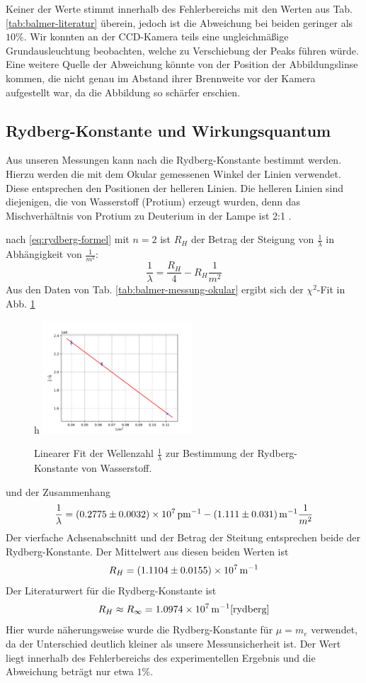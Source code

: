 \documentclass{article}
\begin{document}
Keiner der Werte stimmt innerhalb des Fehlerbereichs mit den Werten aus Tab. \ref{tab:balmer-literatur} überein,
jedoch ist die Abweichung bei beiden geringer als $10\%$. 
Wir konnten an der CCD-Kamera teils eine ungleichmäßige Grundausleuchtung beobachten, welche zu Verschiebung der Peaks führen würde.
Eine weitere Quelle der Abweichung könnte von der Position der Abbildungslinse kommen,
die nicht genau im Abstand ihrer Brennweite vor der Kamera aufgestellt war, da die Abbildung so schärfer erschien.


\subsection{Rydberg-Konstante und Wirkungsquantum}
Aus unseren Messungen kann nach die Rydberg-Konstante bestimmt werden.
Hierzu werden die mit dem Okular gemessenen Winkel der Linien verwendet. Diese entsprechen den
Positionen der helleren Linien. Die helleren Linien sind diejenigen, die von Wasserstoff (Protium) erzeugt wurden,
denn das Mischverhältnis von Protium zu Deuterium in der Lampe ist 2:1 \cite{Anleitung}.

nach \eqref{eq:rydberg-formel} mit $n=2$ ist $R_H$ der Betrag der Steigung von $\frac{1}{\lambda}$ in Abhängigkeit von $\frac{1}{m^2}$:
\[
  \frac{1}{\lambda} = \frac{R_H}{4} - R_H \frac{1}{m^2}
\]
Aus den Daten von Tab. \ref{tab:balmer-messung-okular} ergibt sich der $\chi^2$-Fit in Abb. \ref{fig:rydberg-fit}
\begin{figure}{h}
  \centering
  \includegraphics[width=0.5\textwidth]{rydberg_fit}
  \caption{Linearer Fit der Wellenzahl $\frac{1}{\lambda}$ zur Bestimmung der Rydberg-Konstante von Wasserstoff.}
  \label{fig:rydberg-fit}
\end{figure}
und der Zusammenhang
\[
  \frac{1}{\lambda} = \SI{0.2775\pm0.0032e7}{\per\pm} - \SI{1.111\pm0.031}{\per\m} \frac{1}{m^2}
\]
Der vierfache Achsenabschnitt und der Betrag der Steitung entsprechen beide der Rydberg-Konstante.
Der Mittelwert aus diesen beiden Werten ist
\[
  R_H = \SI{1.1104\pm0.0155e7}{\per\m}
\]
Der Literaturwert für die Rydberg-Konstante ist
\begin{equation}
  R_H \approx R_\infty = \SI{1.0974e7}{\per\m} \cite{rydberg}
\end{equation}
Hier wurde näherungsweise wurde die Rydberg-Konstante für $\mu=m_e$ verwendet, da der Unterschied deutlich
kleiner als unsere Messunsicherheit ist. Der Wert liegt innerhalb des Fehlerbereichs des experimentellen Ergebnis
und die Abweichung beträgt nur etwa $1\%$.
\end{document}
